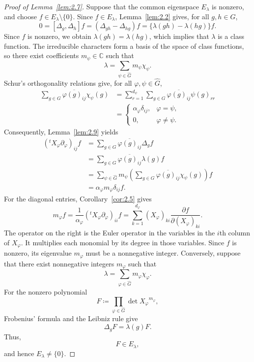 \documentclass[12pt,a4paper]{article}
\theoremstyle{definition}
\numberwithin{definition}{section}
\begin{document}
\begin{proof}[Proof of Lemma~\ref{lem:2.7}]
Suppose that the common eigenspace $E_\lambda$ is nonzero,
and choose $f\in E_\lambda\setminus\{0\}$.
Since $f\in E_\lambda$, Lemma~\ref{lem:2.2} gives, for all $g,h\in G$,
\[
0 = [\Delta_{g}, \Delta_{h}] f = (\Delta_{g h} - \Delta_{h g}) f = \{ \lambda(g h) - \lambda(h g) \} f.
\]
Since $f$ is nonzero, we obtain $\lambda(gh)=\lambda(hg)$,
which implies that $\lambda$ is a class function.
The irreducible characters form a basis of the space of class functions,
so there exist coefficients $m_\psi\in\mathbb C$ such that
\[
 \lambda
 =
 \sum_{\psi \in \widehat{G}}
 m_{\psi} \chi_{\psi}.
\]
Schur's orthogonality relations give, for all $\varphi,\psi\in\widehat G$,
\begin{align*}
\sum_{g \in G}
\overline{\varphi(g)_{ij}} \chi_{\psi}(g)
&=
\sum_{r=1}^{d_\psi}
\sum_{g \in G}
\overline{\varphi(g)_{ij}} \psi(g)_{rr}\\
&=
\begin{cases}
\alpha_{\varphi} \delta_{ij}, & \varphi = \psi, \\
0, & \varphi \neq \psi.
\end{cases}
\end{align*}
Consequently, Lemma~\ref{lem:2.9} yields
\begin{align*}
 ({}^tX_\varphi\partial_\varphi)_{ij}f
 &=
 \sum_{g\in G}
 \overline{\varphi(g)_{ij}}\Delta_gf\\
 &=
 \sum_{g\in G}
 \overline{\varphi(g)_{ij}}\lambda(g)f\\
 &=
 \sum_{\psi \in \widehat{G}}m_{\psi}
 \left(
 \sum_{g \in G}
 \overline{\varphi(g)_{ij}} \chi_{\psi}(g)
 \right)f\\
 &=
 \alpha_{\varphi} m_{\varphi} \delta_{i j} f.
\end{align*}
For the diagonal entries, Corollary~\ref{cor:2.5} gives
\[
 m_\varphi f
 =
 \frac{1}{\alpha_{\varphi}} ({}^{t} X_{\varphi} \partial_{\varphi})_{i i} f
 =
 \sum_{k=1}^{d_\varphi}
 (X_\varphi)_{ki}
 \frac{\partial f}
 {\partial(X_\varphi)_{ki}}.
\]
The operator on the right is the Euler operator in the variables
in the $i$th column of $X_\varphi$.
It multiplies each monomial by its degree in those variables.
Since $f$ is nonzero, its eigenvalue $m_\varphi$ must be a nonnegative integer.
Conversely, suppose that there exist nonnegative integers $m_\varphi$ such that
\[
 \lambda
 =
 \sum_{\varphi \in \widehat{G}}
 m_{\varphi} \chi_{\varphi}.
\]
For the nonzero polynomial
\[
F \coloneqq \prod_{\varphi \in \widehat{G}} \det{X_{\varphi}}^{m_{\varphi}},
\]
Frobenius' formula and the Leibniz rule give
\[
 \Delta_g F
 =
 \lambda(g) F.
\]
Thus,
\[
F \in E_\lambda,
\]
and hence $E_\lambda\ne\{0\}$.
\end{proof}
\end{document}
